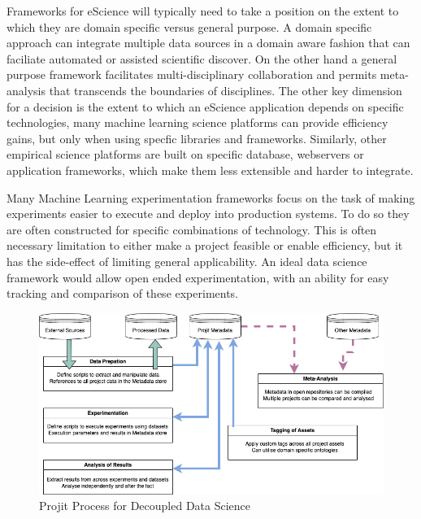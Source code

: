 \documentclass[sigconf]{acmart}
\begin{document}
Frameworks for eScience will typically need to take a position on the extent to which 
they are domain specific versus general purpose. A domain specific approach can 
integrate multiple data sources in a domain aware fashion that can faciliate 
automated or assisted scientific discover\cite{Howe2008}. On the
other hand a general purpose framework facilitates multi-disciplinary collaboration 
and permits meta-analysis that transcends the boundaries of disciplines. 
The other key dimension for a decision is the extent to which an eScience 
application depends on specific technologies, many machine learning science platforms
can provide efficiency gains, but only when using specfic libraries and 
frameworks\cite{Alberti:2018,MolnerDomenech:2020}. Similarly, other empirical 
science platforms are built on specific database, webservers or application
frameworks, which make them less extensible and harder to integrate.

Many Machine Learning experimentation frameworks focus on the task of making experiments
easier to execute and deploy into production systems\cite{Alberti:2018,MolnerDomenech:2020}.
To do so they are often constructed for specific combinations of technology.
This is often necessary limitation to either make a project feasible or enable efficiency,
but it has the side-effect of limiting general applicability. An ideal data science
framework would allow open ended experimentation, with an ability for easy tracking
and comparison of these experiments.

\begin{figure}
\includegraphics[scale=0.6]{./images/Projit_decoupled_process.drawio.png}
\caption{Projit Process for Decoupled Data Science}
\label{fig:projit}
\end{figure}
\end{document}
